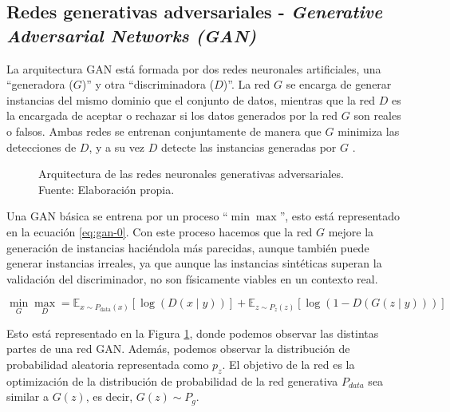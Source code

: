 \subsection{Redes generativas adversariales - \textit{Generative Adversarial Networks (GAN)}}

La arquitectura \gls{GAN} está formada por dos redes neuronales artificiales, una ``generadora ($G$)'' y otra ``discriminadora ($D$)''. La red $G$ se encarga de generar instancias del mismo dominio que el conjunto de datos, mientras que la red $D$ es la encargada de aceptar o rechazar si los datos generados por la red $G$ son reales o falsos. Ambas redes se entrenan conjuntamente de manera que $G$ minimiza las detecciones de $D$, y a su vez $D$ detecte las instancias generadas por $G$ \cite{de2023redes}.

\begin{figure}[H]
    \centering
    \centerline{}
    \caption{Arquitectura de las redes neuronales generativas adversariales.\\Fuente: Elaboración propia.}
    \label{fig:gans-architecture}
\end{figure}

Una \gls{GAN} básica se entrena por un proceso ``$\min\max$'', esto está representado en la ecuación \ref{eq:gan-0}. Con este proceso hacemos que la red $G$ mejore la generación de instancias haciéndola más parecidas, aunque también puede generar instancias irreales, ya que aunque las instancias sintéticas superan la validación del discriminador, no son físicamente viables en un contexto real.

\begin{equation}
    \min_{G}\max_{D} = \mathbb{E}_{x\sim{}P_{\textrm{data}}(x)} \left[\log\left(D(x\mid{}y)\right)\right] + \mathbb{E}_{z\sim{}P_{z}(z)} \left[\log\left(1-D(G(z\mid{}y))\right)\right]
    \label{eq:gan-0}
\end{equation}

Esto está representado en la Figura \ref{fig:gans-architecture}, donde podemos observar las distintas partes de una red \gls{GAN}. Además, podemos observar la distribución de probabilidad aleatoria representada como $p_{z}$. El objetivo de la red es la optimización de la distribución de probabilidad de la red generativa $P_{data}$ sea similar a $G(z)$, es decir, $G(z)\sim{}P_{g}$.

